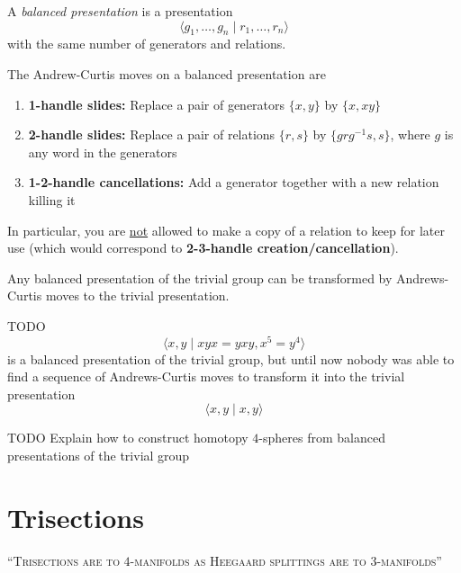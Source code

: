 \begin{definition}
	A \textit{balanced presentation}  is a presentation
	\[
		\langle g_1, \ldots, g_n \mid r_1, \ldots, r_n \rangle
	\]
	with the same number of generators and relations.
	
	The Andrew-Curtis moves on a balanced presentation are
	\begin{enumerate}[label=(\roman*)]
		\item \textbf{1-handle slides:} Replace a pair of generators
		$ \{ x, y \} $ by $ \{ x, xy \} $
		
		\item \textbf{2-handle slides:} Replace a pair of relations
		$ \{ r, s \} $ by $ \{ grg^{-1}s, s \} $, where $ g $ is any word in the generators
		
		\item \textbf{1-2-handle cancellations:} Add a generator together with
		a new relation killing it
	\end{enumerate}
	In particular, you are \underline{not} allowed to make a copy of a relation to
	keep for later use (which would correspond to 
	\textbf{2-3-handle creation/cancellation}).
\end{definition}

\begin{conjecture*}
	Any balanced presentation of the trivial group can be transformed
	by Andrews-Curtis moves to the trivial presentation.
\end{conjecture*}

\begin{example}
	TODO
	\[
		\langle x, y \mid xyx = yxy, x^{5} = y^{4} \rangle
	\]
	is a balanced presentation of the trivial group,
	but until now nobody was able to find a sequence of
	Andrews-Curtis moves to transform it into the trivial presentation
	\[
		\langle x, y \mid x, y \rangle
	\]
\end{example}

TODO
Explain how to construct homotopy $4$-spheres from balanced
presentations of the trivial group
\citep{akbulut1985potential}

\section{Trisections}

\begin{center}
	\textsc{``Trisections are to $4$-manifolds as Heegaard splittings are to
		$3$-manifolds''}
\end{center}


